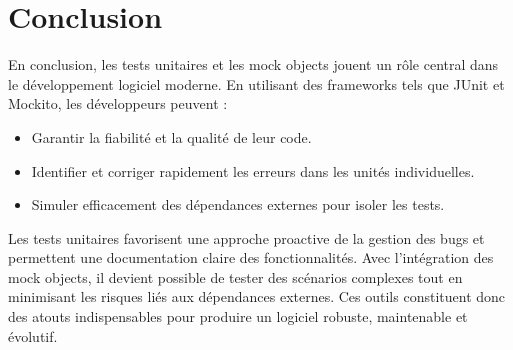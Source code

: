 \documentclass[12pt,a4paper]{article}
\begin{document}
\section*{Conclusion}
En conclusion, les tests unitaires et les mock objects jouent un rôle central dans le développement logiciel moderne. En utilisant des frameworks tels que JUnit et Mockito, les développeurs peuvent :
\begin{itemize}
    \item Garantir la fiabilité et la qualité de leur code.
    \item Identifier et corriger rapidement les erreurs dans les unités individuelles.
    \item Simuler efficacement des dépendances externes pour isoler les tests.
\end{itemize}

Les tests unitaires favorisent une approche proactive de la gestion des bugs et permettent une documentation claire des fonctionnalités. Avec l’intégration des mock objects, il devient possible de tester des scénarios complexes tout en minimisant les risques liés aux dépendances externes. Ces outils constituent donc des atouts indispensables pour produire un logiciel robuste, maintenable et évolutif.
\end{document}

